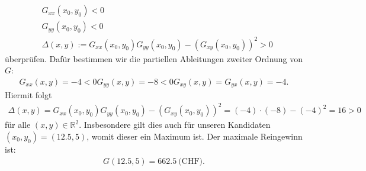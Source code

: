 \begin{align*}
	&G_{xx}(x_0,y_0) < 0 \\
	&G_{yy}(x_0,y_0) < 0\\
	&\Delta(x,y) := G_{xx}(x_0,y_0)G_{yy}(x_0,y_0)-(G_{xy}(x_0,y_0))^2 > 0
\end{align*}
überprüfen. Dafür bestimmen wir die partiellen Ableitungen zweiter Ordnung von $ G $:
\begin{align*}
	G_{xx}(x,y) = -4 < 0
	G_{yy}(x,y) = -8 < 0
	G_{xy}(x,y) = G_{yx}(x,y) = -4.
\end{align*}
Hiermit folgt
\begin{align*}
	\Delta(x,y) = G_{xx}(x_0,y_0)G_{yy}(x_0,y_0)-(G_{xy}(x_0,y_0))^2
	= (-4)\cdot(-8) - (-4)^2 = 16  >0
\end{align*}
für alle $ (x,y) \in \mathbb{R}^2 $. Insbesondere gilt dies auch für unseren Kandidaten $ (x_0,y_0) = (12.5,5) $, womit dieser ein Maximum ist. Der maximale Reingewinn ist:
\begin{align*}
	G(12.5,5) = 662.5 \ \textrm{(CHF)}.
\end{align*} 





\newpage

